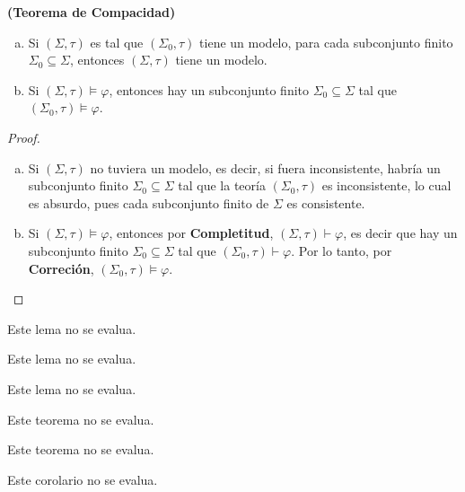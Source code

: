   \begin{corollary} \label{corollary_84}
    \PN \textbf{(Teorema de Compacidad)}
    \begin{enumerate}[(a)]
      \item Si $(\Sigma, \tau)$ es tal que $(\Sigma_{0}, \tau)$ tiene un modelo, para cada subconjunto finito
      $\Sigma_{0} \subseteq \Sigma$, entonces $(\Sigma, \tau)$ tiene un modelo.
      \item Si $(\Sigma, \tau) \models \varphi$, entonces hay un subconjunto finito $\Sigma_{0} \subseteq \Sigma$ tal
      que $(\Sigma_{0}, \tau) \models \varphi$.
    \end{enumerate}
  \end{corollary}
  \begin{proof}
    \begin{enumerate}[(a)]
      \item Si $(\Sigma, \tau)$ no tuviera un modelo, es decir, si fuera inconsistente, habría un subconjunto finito
        $\Sigma_{0} \subseteq \Sigma$ tal que la teoría $(\Sigma_{0}, \tau)$ es inconsistente, lo cual es absurdo, pues
        cada subconjunto finito de $\Sigma$ es consistente.
      \item Si $(\Sigma, \tau) \models \varphi$, entonces por \textbf{Completitud}, $(\Sigma, \tau) \vdash \varphi$, es
        decir que hay un subconjunto finito $\Sigma_{0} \subseteq \Sigma$ tal que $(\Sigma_{0}, \tau) \vdash \varphi$.
        Por lo tanto, por \textbf{Correción}, $(\Sigma_{0}, \tau) \models \varphi$.
    \end{enumerate}
  \end{proof}


  \begin{lemma}
    \PN Este lema no se evalua.
  \end{lemma}

  \begin{lemma}
    \PN Este lema no se evalua.
  \end{lemma}

  \begin{lemma}
    \PN Este lema no se evalua.
  \end{lemma}

  \begin{theorem}
    \PN Este teorema no se evalua.
  \end{theorem}

  \begin{theorem}
    \PN Este teorema no se evalua.
  \end{theorem}

  \begin{corollary}
    \PN Este corolario no se evalua.
  \end{corollary}
